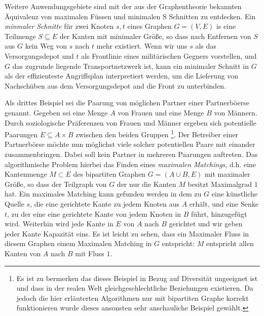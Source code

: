 \documentclass[a4paper]{article}
\begin{document}
Weitere Anwendungsgebiete sind mit der aus der Graphentheorie 
bekannten \"Aquivalenz von maximalen F\"ussen und minimalen S
Schnitten zu entdecken. Ein \emph{minmaler Schnitte} f\"ur 
zwei Knoten $s,t$ eines Graphen $G = (V,E)$ is eine Teilmenge
 $S \subseteq E$ der Kanten mit minimaler Gr\"o\ss e, 
so dass nach Entfernen von $S$ aus $G$ kein Weg von $s$ nach $t$ 
mehr existiert. Wenn wir uns $s$ als das Versorgungsdepot 
und $t$ als Frontlinie eines milit\"arischen Gegners vorstellen, 
und $G$ das zugrunde liegende Transportnetzwerk ist, kann 
ein minimaler Schnitt in $G$ als der effizienteste Angriffsplan
interpretiert werden, um die Lieferung von Nachsch\"uben aus 
dem Versorgungsdepot and die Front zu unterbinden.

Als drittes Beispiel sei die Paarung von m\"oglichen Partner 
einer Partnerb\"oerse genannt. Gegeben sei eine Menge $A$ von 
Frauen und eine Menge $B$ von M\"annern. 
Durch soziologische Pr\"aferenzen von Frauen und  M\"anner 
ergeben sich potentielle Paarungen $E \subseteq A \times B$
zwischen den beiden Gruppen
\footnote{
Es ist zu bermerken das dieses Beispiel in Bezug auf Diversit\"at
ungeeignet ist und dass in der realen Welt gleichgeschlechtliche 
Beziehungen existieren. Da jedoch die hier erl\"auterten 
Algorithmen nur mit bipartiten Graphe korrekt funktionieren wurde
dieses ansonsten sehr anschauliche Beispiel gew\"ahlt.
}.
Der Betreiber einer Partnerb\"orse m\"ochte nun m\"oglichst viele
solcher potentiellen Paare mit einander zusammenbringen.
Dabei soll kein Partner in mehreren Paarungen auftreten. 
Das algorithmische Problem hierbei das Finden eines 
\emph{maximalen Matchings}, d.h. eine Kantenmenge 
$M \subset E$ des bipartiten Graphen $G = (A \cup B, E)$ mit 
maximaler Gr\"o\ss e, so dass der Teilgraph von $G$ der nur 
die Kanten $M$ besitzt Maximalgrad $1$ hat. Ein maximales Matching
kann gefunden werden in dem zu $G$ eine k\"unstliche Quelle $s$, 
die eine gerichtete Kante zu jedem Knoten aus $A$ erh\"alt, 
und eine Senke $t$, zu der eine eine gerichtete Kante von jedem 
Knoten in $B$ f\"uhrt, hinzugef\"ugt wird. Weiterhin wird jede
Kante in $E$ von $A$ nach $B$ gerichtet und wir geben jeder 
Kante Kapazit\"at eins. Es ist leicht zu sehen, 
dass ein Maximaler Fluss in diesem Graphen einem Maximalen 
Matching in $G$ entspricht: $M$ entspricht allen Kanten von $A$
nach $B$ mit Fluss $1$.
\end{document}
